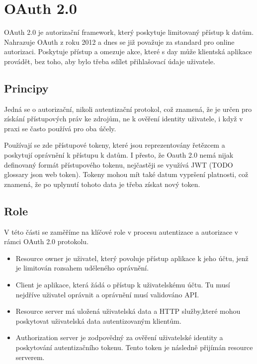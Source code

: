\section{OAuth 2.0}
OAuth 2.0 je autorizační framework, který poskytuje limitovaný přístup k datům. Nahrazuje OAuth z roku 2012 a dnes se již považuje za standard pro online autorizaci. Poskytuje přístup a omezuje akce, které s day může klientská aplikace provádět, bez toho, aby bylo třeba sdílet přihlašovací údaje uživatele.


\subsection{Principy}
Jedná se o autorizační, nikoli autentizační protokol, což znamená, že je určen pro získání přístupových práv ke zdrojům, ne k ověření identity uživatele, i když v praxi se často používá pro oba účely.

Používají se zde přístupové tokeny, které jsou reprezentovány řetězcem a poskytují oprávnění k přístupu k datům. I přesto, že Oauth 2.0 nemá nijak definovaný formát přístupového tokenu, nejčastěji se využívá JWT (TODO glossary json web token). Tokeny mohou mít také datum vypršení platnosti, což znamená, že po uplynutí tohoto data je třeba získat nový token.


\subsection{Role}\label{sec:Oauth_roles}
V této části se zaměříme na klíčové role v procesu autentizace a autorizace v rámci OAuth 2.0 protokolu.

\begin{itemize}
    \item Resource owner je uživatel, který povoluje přístup aplikace k jeho účtu, jenž je limitován rozsahem uděleného oprávnění.
    \item Client je aplikace, která žádá o přístup k uživatelskému účtu. Tu musí nejdříve uživatel oprávnit a oprávnění musí validováno API.
    \item Resource server má uložená uživatelská data a HTTP služby,které mohou poskytovat uživatelská data autentizovaným klientům.
    \item Authorization server je zodpovědný za ověření uživatelské identity a poskytování autentizačního tokenu. Tento token je následně přijímán resource serverem.
\end{itemize}


